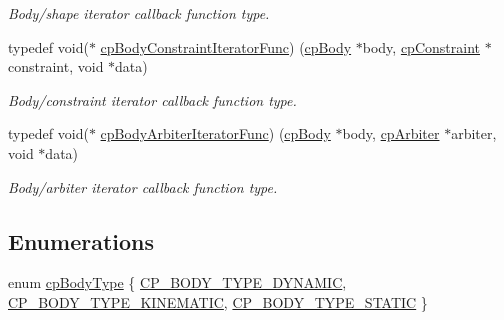 \begin{DoxyCompactItemize}
\begin{DoxyCompactList}\small\item\em Body/shape iterator callback function type. \end{DoxyCompactList}\item 
\hypertarget{group__cp_body_ga8cacab9a606b0dbb1dad405bb0d7ba12}{}typedef void($\ast$ \hyperlink{group__cp_body_ga8cacab9a606b0dbb1dad405bb0d7ba12}{cp\+Body\+Constraint\+Iterator\+Func}) (\hyperlink{structcp_body}{cp\+Body} $\ast$body, \hyperlink{structcp_constraint}{cp\+Constraint} $\ast$constraint, void $\ast$data)\label{group__cp_body_ga8cacab9a606b0dbb1dad405bb0d7ba12}

\begin{DoxyCompactList}\small\item\em Body/constraint iterator callback function type. \end{DoxyCompactList}\item 
\hypertarget{group__cp_body_gac655e03d7b2d7fd0a870a702f9de0026}{}typedef void($\ast$ \hyperlink{group__cp_body_gac655e03d7b2d7fd0a870a702f9de0026}{cp\+Body\+Arbiter\+Iterator\+Func}) (\hyperlink{structcp_body}{cp\+Body} $\ast$body, \hyperlink{structcp_arbiter}{cp\+Arbiter} $\ast$arbiter, void $\ast$data)\label{group__cp_body_gac655e03d7b2d7fd0a870a702f9de0026}

\begin{DoxyCompactList}\small\item\em Body/arbiter iterator callback function type. \end{DoxyCompactList}\end{DoxyCompactItemize}
\subsection*{Enumerations}
\begin{DoxyCompactItemize}
\item 
enum \hyperlink{group__cp_body_ga3581b128fd3e2734952aeac8545fd5ca}{cp\+Body\+Type} \{ \hyperlink{group__cp_body_gga3581b128fd3e2734952aeac8545fd5caa443c53c7b27e64799ee0eba728e60db6}{C\+P\+\_\+\+B\+O\+D\+Y\+\_\+\+T\+Y\+P\+E\+\_\+\+D\+Y\+N\+A\+M\+I\+C}, 
\hyperlink{group__cp_body_gga3581b128fd3e2734952aeac8545fd5caa95e6c8d1ff2714d17bc4f2258407e58d}{C\+P\+\_\+\+B\+O\+D\+Y\+\_\+\+T\+Y\+P\+E\+\_\+\+K\+I\+N\+E\+M\+A\+T\+I\+C}, 
\hyperlink{group__cp_body_gga3581b128fd3e2734952aeac8545fd5caaa594879f082bbabce4bd16944f73456b}{C\+P\+\_\+\+B\+O\+D\+Y\+\_\+\+T\+Y\+P\+E\+\_\+\+S\+T\+A\+T\+I\+C}
 \}
\end{DoxyCompactItemize}
